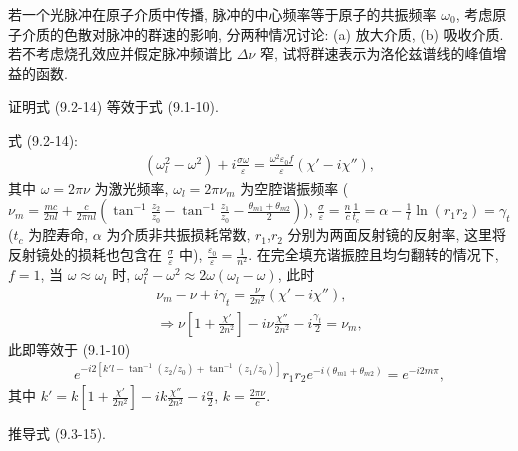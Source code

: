 \documentclass{note}
\begin{document}
\begin{exe}
    若一个光脉冲在原子介质中传播, 脉冲的中心频率等于原子的共振频率 $\omega_0$, 考虑原子介质的色散对脉冲的群速的影响, 分两种情况讨论: (a) 放大介质, (b) 吸收介质. 若不考虑烧孔效应并假定脉冲频谱比 $\Delta\nu$ 窄, 试将群速表示为洛伦兹谱线的峰值增益的函数.
\end{exe}
\begin{sol}

\end{sol}

\begin{exe}
    证明式 (9.2-14) 等效于式 (9.1-10).
\end{exe}
\begin{pf}
    式 (9.2-14):
    \begin{align}
        (\omega_l^2-\omega^2)+i\frac{\sigma\omega}{\varepsilon}=\frac{\omega^2\varepsilon_0f}{\varepsilon}(\chi'-i\chi''),
    \end{align}
    其中 $\omega=2\pi\nu$ 为激光频率, $\omega_l=2\pi\nu_m$ 为空腔谐振频率 ($\nu_m=\frac{mc}{2nl}+\frac{c}{2\pi nl}\left(\tan^{-1}\frac{z_2}{z_0}-\tan^{-1}\frac{z_1}{z_0}-\frac{\theta_{m1}+\theta_{m2}}{2}\right)$), $\frac{\sigma}{\varepsilon}=\frac{n}{c}\frac{1}{t_c}=\alpha-\frac{1}{l}\ln(r_1r_2)=\gamma_t$ ($t_c$ 为腔寿命, $\alpha$ 为介质非共振损耗常数, $r_1$,$r_2$ 分别为两面反射镜的反射率, 这里将反射镜处的损耗也包含在 $\frac{\sigma}{\varepsilon}$ 中), $\frac{\varepsilon_0}{\varepsilon}=\frac{1}{n^2}$.
    在完全填充谐振腔且均匀翻转的情况下, $f=1$, 当 $\omega\approx\omega_l$ 时, $\omega_l^2-\omega^2\approx 2\omega(\omega_l-\omega)$, 此时
    \begin{gather}
        \nu_m-\nu+i\gamma_t=\frac{\nu}{2n^2}(\chi'-i\chi''),\\
        \Longrightarrow\nu\left[1+\frac{\chi'}{2n^2}\right]-i\nu\frac{\chi''}{2n^2}-i\frac{\gamma_t}{2}=\nu_m,
    \end{gather}
    此即等效于 (9.1-10)
    \begin{align}
        e^{-i2[k'l-\tan^{-1}(z_2/z_0)+\tan^{-1}(z_1/z_0)]}r_1r_2e^{-i(\theta_{m1}+\theta_{m2})}=e^{-i2m\pi},
    \end{align}
    其中 $k'=k\left[1+\frac{\chi'}{2n^2}\right]-ik\frac{\chi''}{2n^2}-i\frac{\alpha}{2}$, $k=\frac{2\pi\nu}{c}$.
\end{pf}

\begin{exe}
    推导式 (9.3-15).
\end{exe}
\begin{pf}
    
\end{pf}
\ifx\allfiles\undefined
\end{document}
